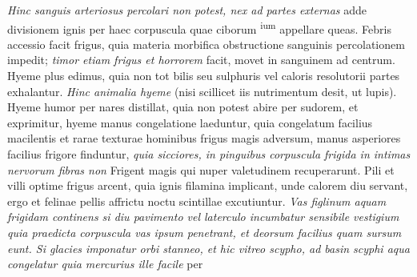 \pend
\newpage
\pstart
\noindent\textit{Hinc sanguis arteriosus\protect{} percolari non potest, nex ad partes externas } adde divisionem ignis per haec corpuscula quae ciborum \mercury\textsuperscript{ium}\protect{} appellare queas. Febris accessio\protect{} facit frigus, quia materia morbifica\protect{} obstructione sanguinis percolationem impedit; \textit{timor\protect{} etiam frigus et horrorem\protect{}} facit, movet in sanguinem ad centrum. Hyeme plus edimus, quia non tot bilis seu sulphuris vel caloris resolutorii partes\protect{}\protect{}\protect{} exhalantur. \textit{Hinc animalia hyeme } (nisi scillicet iis nutrimentum\protect{} desit, ut lupis). Hyeme humor per nares\protect{} distillat, quia non potest abire per sudorem\protect{}, et exprimitur, hyeme manus congelatione laeduntur, quia congelatum facilius  macilentis et rarae texturae hominibus frigus magis adversum, manus asperiores facilius frigore finduntur, \textit{quia sicciores, in pinguibus corpuscula frigida in intimas nervorum fibras\protect{} non } Frigent magis qui nuper valetudinem recuperarunt. Pili\protect{} et villi\protect{} optime frigus arcent, quia ignis filamina implicant, unde calorem diu servant, ergo et felinae pellis\protect{} affrictu noctu scintillae excutiuntur. \textit{Vas figlinum aquam frigidam continens si diu pavimento vel laterculo incumbatur sensibile vestigium 
quia praedicta corpuscula vas ipsum penetrant, et deorsum facilius quam sursum eunt. Si glacies imponatur orbi stanneo, et hic vitreo scypho\protect{}, ad basin scyphi aqua congelatur quia mercurius\protect{} ille facile } per
